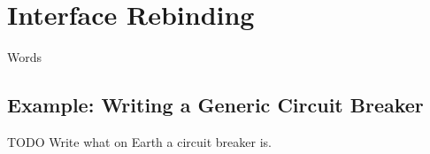 \section{Interface Rebinding}
\label{sec:interface_rebinding}

Words

\subsection{Example: Writing a Generic Circuit Breaker}

TODO Write what on Earth a circuit breaker is.
